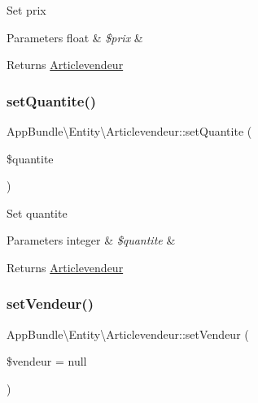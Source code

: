 Set prix


\begin{DoxyParams}[1]{Parameters}
float & {\em \$prix} & \\
\hline
\end{DoxyParams}
\begin{DoxyReturn}{Returns}
\hyperlink{class_app_bundle_1_1_entity_1_1_articlevendeur}{Articlevendeur} 
\end{DoxyReturn}
\mbox{\label{class_app_bundle_1_1_entity_1_1_articlevendeur_a89e18aa5866a10cf09494b581956481a}} 
\subsubsection{\texorpdfstring{set\+Quantite()}{setQuantite()}}
{\footnotesize\ttfamily App\+Bundle\textbackslash{}\+Entity\textbackslash{}\+Articlevendeur\+::set\+Quantite (\begin{DoxyParamCaption}\item[{}]{\$quantite }\end{DoxyParamCaption})}

Set quantite


\begin{DoxyParams}[1]{Parameters}
integer & {\em \$quantite} & \\
\hline
\end{DoxyParams}
\begin{DoxyReturn}{Returns}
\hyperlink{class_app_bundle_1_1_entity_1_1_articlevendeur}{Articlevendeur} 
\end{DoxyReturn}
\mbox{\label{class_app_bundle_1_1_entity_1_1_articlevendeur_a85db136e335effe7933ebc67d1826635}} 
\subsubsection{\texorpdfstring{set\+Vendeur()}{setVendeur()}}
{\footnotesize\ttfamily App\+Bundle\textbackslash{}\+Entity\textbackslash{}\+Articlevendeur\+::set\+Vendeur (\begin{DoxyParamCaption}\item[{\textbackslash{}\hyperlink{class_app_bundle_1_1_entity_1_1_vendeur}{App\+Bundle\textbackslash{}\+Entity\textbackslash{}\+Vendeur}}]{\$vendeur = {\ttfamily null} }\end{DoxyParamCaption})}

